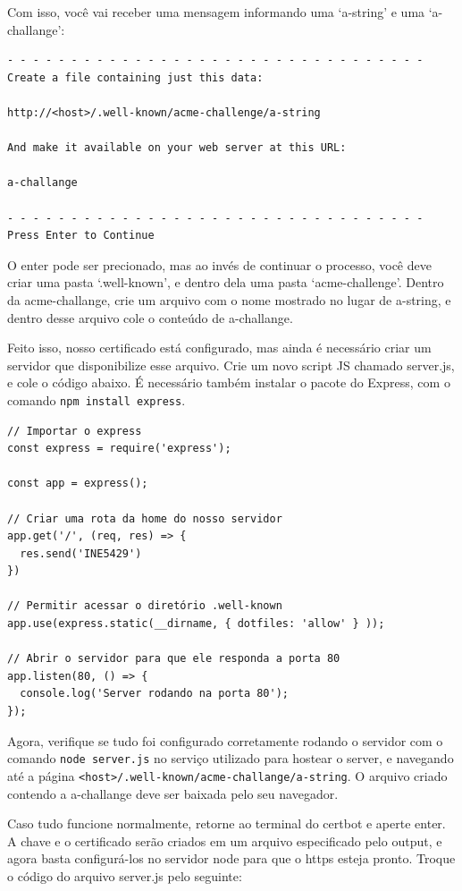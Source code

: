 \documentclass{article}
\begin{document}
Com isso, você vai receber uma mensagem informando uma `a-string' e uma `a-challange':

\begin{verbatim}
- - - - - - - - - - - - - - - - - - - - - - - - - - - - - - - - -
Create a file containing just this data:

http://<host>/.well-known/acme-challenge/a-string

And make it available on your web server at this URL:

a-challange

- - - - - - - - - - - - - - - - - - - - - - - - - - - - - - - - - 
Press Enter to Continue

\end{verbatim}

O enter pode ser precionado, mas ao invés de continuar o processo, você deve criar uma pasta `.well-known', e dentro dela uma pasta `acme-challenge'. Dentro da acme-challange, crie um arquivo com o nome mostrado no lugar de a-string, e dentro desse arquivo cole o conteúdo de a-challange.

Feito isso, nosso certificado está configurado, mas ainda é necessário criar um servidor que disponibilize esse arquivo. Crie um novo script JS chamado server.js, e cole o código abaixo. É necessário também instalar o pacote do Express, com o comando \texttt{npm install express}.

\begin{verbatim}
// Importar o express
const express = require('express');

const app = express();

// Criar uma rota da home do nosso servidor
app.get('/', (req, res) => {
  res.send('INE5429')
})

// Permitir acessar o diretório .well-known
app.use(express.static(__dirname, { dotfiles: 'allow' } ));

// Abrir o servidor para que ele responda a porta 80
app.listen(80, () => {
  console.log('Server rodando na porta 80');
});
\end{verbatim}

Agora, verifique se tudo foi configurado corretamente rodando o servidor com o comando \texttt{node server.js} no serviço utilizado para hostear o server, e navegando até a página \texttt{<host>/.well-known/acme-challange/a-string}. O arquivo criado contendo a a-challange deve ser baixada pelo seu navegador.

Caso tudo funcione normalmente, retorne ao terminal do certbot e aperte enter. A chave e o certificado serão criados em um arquivo especificado pelo output, e agora basta configurá-los no servidor node para que o https esteja pronto. Troque o código do arquivo server.js pelo seguinte:
\end{document}
